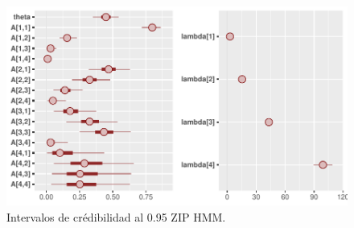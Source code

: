 \documentclass[a4paper]{article}\usepackage[]{graphicx}\usepackage[]{color}
\makeatletter
\def\maxwidth{ %
  \ifdim\Gin@nat@width>\linewidth
    \linewidth
  \else
    \Gin@nat@width
  \fi
}
\newenvironment{knitrout}{}{} %
\makeatother
\begin{document}
\begin{knitrout}
\color{fgcolor}\begin{figure}
\includegraphics[width=\maxwidth]{figure/unnamed-chunk-53-1} \caption[Intervalos de crédibilidad al 0.95 ZIP HMM]{Intervalos de crédibilidad al 0.95 ZIP HMM.}\label{fig:unnamed-chunk-53}
\end{figure}


\end{knitrout}
\end{document}
